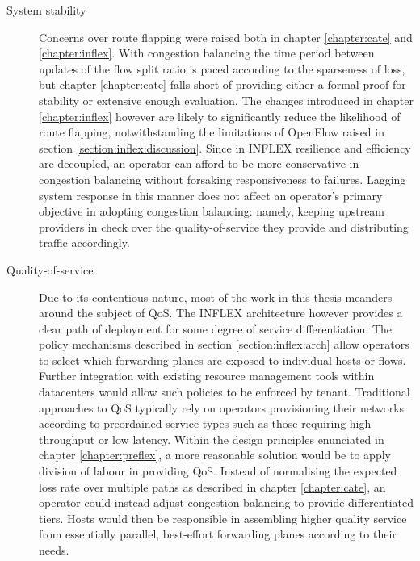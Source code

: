\renewcommand{\descriptionlabel}[1]{\hspace{\labelsep}\textbf{#1.}}
\begin{description}
\item[System stability]{
Concerns over route flapping were raised both in chapter \ref{chapter:cate} and \ref{chapter:inflex}.
With congestion balancing the time period between updates of the flow split ratio is paced according to the sparseness of loss, but chapter \ref{chapter:cate} falls short of providing either a formal proof for stability or extensive enough evaluation.
The changes introduced in chapter \ref{chapter:inflex} however are likely to significantly reduce the likelihood of route flapping, notwithstanding the limitations of OpenFlow raised in section \ref{section:inflex:discussion}.
Since in INFLEX resilience and efficiency are decoupled, an operator can afford to be more conservative in congestion balancing without forsaking responsiveness to failures.
Lagging system response in this manner does not affect an operator's primary objective in adopting congestion balancing: namely, keeping upstream providers in check over the quality-of-service they provide and distributing traffic accordingly.
}
\item[Quality-of-service]{
Due to its contentious nature, most of the work in this thesis meanders around the subject of \ac{QoS}.
The INFLEX architecture however provides a clear path of deployment for some degree of service differentiation.
The policy mechanisms described in section \ref{section:inflex:arch} allow operators to select which forwarding planes are exposed to individual hosts or flows.
Further integration with existing resource management tools within datacenters would allow such policies to be enforced by tenant.
Traditional approaches to \ac{QoS} typically rely on operators provisioning their networks according to preordained service types such as those requiring high throughput or low latency.
Within the design principles enunciated in chapter \ref{chapter:preflex}, a more reasonable solution would be to apply division of labour in providing \ac{QoS}.
Instead of normalising the expected loss rate over multiple paths as described in chapter \ref{chapter:cate}, an operator could instead adjust congestion balancing to provide differentiated tiers.
Hosts would then be responsible in assembling higher quality service from essentially parallel, best-effort forwarding planes according to their needs.
}



\end{description}
